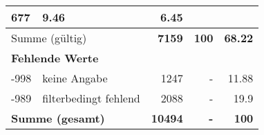 \begin{longtable}{lXrrr}
       \num{677} &
       \num[round-mode=places,round-precision=2]{9,46} &
         \num[round-mode=places,round-precision=2]{6,45} \\
     \midrule
     \multicolumn{2}{l}{Summe (gültig)} &
       \textbf{\num{7159}} &
     \textbf{100} &
       \textbf{\num[round-mode=places,round-precision=2]{68,22}} \\
     \multicolumn{5}{l}{\textbf{Fehlende Werte}}\\
       -998 &
       keine Angabe &
         \num{1247} &
        - &
         \num[round-mode=places,round-precision=2]{11,88} \\
       -989 &
       filterbedingt fehlend &
         \num{2088} &
        - &
         \num[round-mode=places,round-precision=2]{19,9} \\
     \midrule
     \multicolumn{2}{l}{\textbf{Summe (gesamt)}} &
          \textbf{\num{10494}} &
        \textbf{-} &
        \textbf{100} \\
     \bottomrule
     \end{longtable}
     
